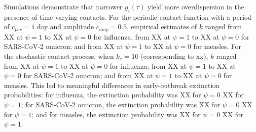 Simulations demonstrate that narrower $g_i(\tau)$ yield more overdispersion in the presence of time-varying contacts. For the periodic contact function with a period of $c_{per} = 1$ day and amplitude $c_{amp} = 0.5$, empirical estimates of $k$ ranged from XX at $\psi = 1$ to XX at $\psi = 0$ for influenza; from XX at $\psi = 1$ to XX at $\psi = 0$ for SARS-CoV-2 omicron; and from XX at $\psi = 1$ to XX at $\psi = 0$ for measles. For the stochastic contact process, when $k_c = 10$ (corresponding to xx), $k$ ranged from XX at $\psi = 1$ to XX at $\psi = 0$ for influenza; from XX at $\psi = 1$ to XX at $\psi = 0$ for SARS-CoV-2 omicron; and from XX at $\psi = 1$ to XX at $\psi = 0$ for measles. This led to meaningful differences in early-outbreak extinction probabilities: for influenza, the extinction probability was XX for $\psi = 0$ \vs XX for $\psi = 1$; for SARS-CoV-2 omicron, the extinction probability was XX for $\psi = 0$ \vs XX for $\psi = 1$; and for measles, the extinction probability was XX for $\psi = 0$ \vs XX for $\psi = 1$. 


